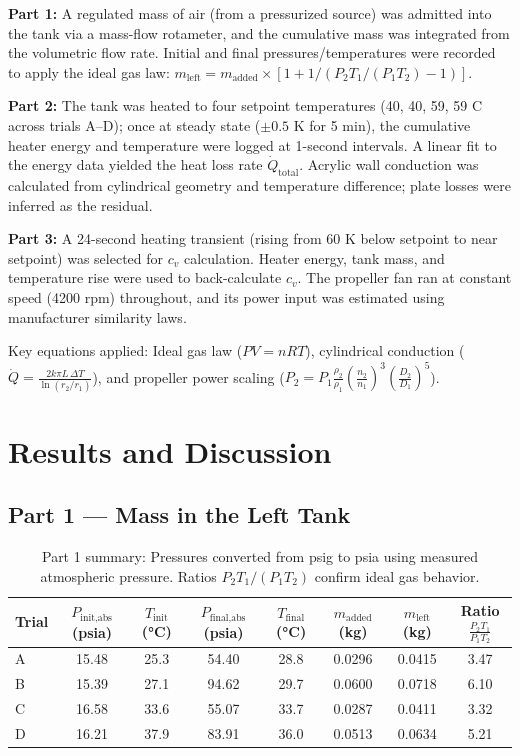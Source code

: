 \documentclass[12pt]{article}
\begin{document}
\textbf{Part 1:} A regulated mass of air (from a pressurized source) was admitted into the tank via a mass-flow rotameter, and the cumulative mass was integrated from the volumetric flow rate. Initial and final pressures/temperatures were recorded to apply the ideal gas law: $m_{\text{left}} = m_{\text{added}} \times [1 + 1/(P_2 T_1 / (P_1 T_2) - 1)]$.~\cite{che260_manual}

\textbf{Part 2:} The tank was heated to four setpoint temperatures (40, 40, 59, 59 \textdegree C across trials A–D); once at steady state ($\pm 0.5$ K for 5 min), the cumulative heater energy and temperature were logged at 1-second intervals. A linear fit to the energy data yielded the heat loss rate $\dot{Q}_{\text{total}}$. Acrylic wall conduction was calculated from cylindrical geometry and temperature difference; plate losses were inferred as the residual.

\textbf{Part 3:} A 24-second heating transient (rising from 60 K below setpoint to near setpoint) was selected for $c_v$ calculation. Heater energy, tank mass, and temperature rise were used to back-calculate $c_v$. The propeller fan ran at constant speed (4200 rpm) throughout, and its power input was estimated using manufacturer similarity laws.

Key equations applied: Ideal gas law ($PV=nRT$), cylindrical conduction ($\dot{Q}=\frac{2k\pi L\,\Delta T}{\ln(r_2/r_1)}$), and propeller power scaling ($P_2 = P_1 \frac{\rho_2}{\rho_1} \left(\frac{n_2}{n_1}\right)^3 \left(\frac{D_2}{D_1}\right)^5$).~\cite{che260_manual}

\section*{Results and Discussion}

\subsection*{Part 1 — Mass in the Left Tank}
\begin{table}[H]
\centering
\begin{tabular}{@{}lccccccc@{}}
\toprule
Trial & $P_{\text{init,abs}}$ (psia) & $T_{\text{init}}$ (\si{\celsius}) & $P_{\text{final,abs}}$ (psia) & $T_{\text{final}}$ (\si{\celsius}) & $m_{\text{added}}$ (kg) & $m_{\text{left}}$ (kg) & Ratio $\frac{P_2T_1}{P_1T_2}$ \\
\midrule
A & 15.48 & 25.3 & 54.40 & 28.8 & 0.0296 & 0.0415 & 3.47 \\
B & 15.39 & 27.1 & 94.62 & 29.7 & 0.0600 & 0.0718 & 6.10 \\
C & 16.58 & 33.6 & 55.07 & 33.7 & 0.0287 & 0.0411 & 3.32 \\
D & 16.21 & 37.9 & 83.91 & 36.0 & 0.0513 & 0.0634 & 5.21 \\
\bottomrule
\end{tabular}
\caption{Part 1 summary: Pressures converted from psig to psia using measured atmospheric pressure. Ratios $P_2T_1/(P_1T_2)$ confirm ideal gas behavior.}
\label{tab:part1}
\end{table}
\end{document}
